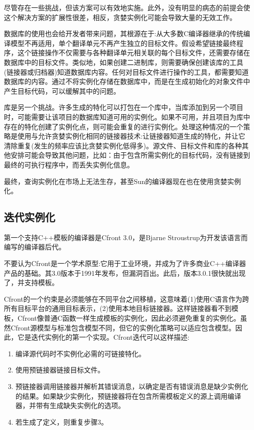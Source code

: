 尽管存在一些挑战，但该方案可以有效地实施。此外，没有明显的病态的前提会使这个解决方案的扩展性很差，相反，贪婪实例化可能会导致大量的无效工作。

数据库的使用也会给开发者带来问题，其根源在于:从大多数C编译器继承的传统编译模型不再适用，单个翻译单元不再产生独立的目标文件。假设希望链接最终程序，这个链接操作不仅需要与各种翻译单元相关联的每个目标文件，还需要存储在数据库中的目标文件。类似地，如果创建二进制库，则需要确保创建该库的工具(链接器或归档器)知道数据库内容。任何对目标文件进行操作的工具，都需要知道数据库的内容。通过不将实例化存储在数据库中，而是在生成初始化的对象文件中产生目标代码，可以缓解其中的问题。

库是另一个挑战。许多生成的特化可以打包在一个库中，当库添加到另一个项目时，可能需要让该项目的数据库知道可用的实例化。如果不可用，并且项目为库中存在的特化创建了实例化点，则可能会重复的进行实例化。处理这种情况的一个策略是使用与允许贪婪实例化相同的链接器技术:让链接器知道生成的特化，并让它清除重复(发生的频率应该比贪婪实例化低得多)。源文件、目标文件和库的各种其他安排可能会导致其他问题，比如：由于包含所需实例化的目标代码，没有链接到最终的可执行程序中，而丢失实例化信息。

最终，查询实例化在市场上无法生存，甚至Sun的编译器现在也在使用贪婪实例化。

\subsection{迭代实例化}

第一个支持C++模板的编译器是Cfront 3.0，是Bjarne Stroustrup为开发该语言而编写的编译器后代。

\begin{tcolorbox}[colback=webgreen!5!white,colframe=webgreen!75!black]
\hspace*{0.75cm}不要认为Cfront是一个学术原型:它用于工业环境，并成为了许多商业C++编译器产品的基础。其3.0版本于1991年发布，但漏洞百出。此后，版本3.0.1很快就出现了，并支持模板。
\end{tcolorbox}

Cfront的一个约束是必须能够在不同平台之间移植，这意味着(1)使用C语言作为跨所有目标平台的通用目标表示，(2)使用本地目标链接器。这样链接器看不到模板，Cfront像普通C函数一样生成模板的实例化，因此必须避免重复的实例化。虽然Cfront源模型与标准包含模型不同，但它的实例化策略可以适应包含模型。因此，它是迭代实例化的第一个实现。Cfront迭代可以这样描述:

\begin{enumerate}
\item 
编译源代码时不实例化必需的可链接特化。

\item 
使用预链接器链接目标文件。

\item 
预链接器调用链接器并解析其错误消息，以确定是否有错误消息是缺少实例化的结果。如果缺少实例化，预链接器将在包含所需模板定义的源上调用编译器，并带有生成缺失实例化的选项。

\item 
若生成了定义，则重复步骤3。
\end{enumerate}

